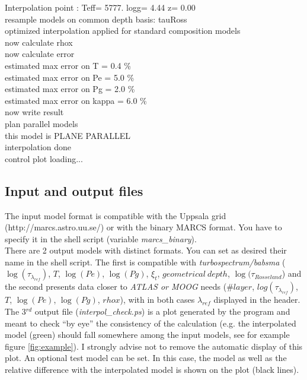 \documentclass[11pt]{article}
\begin{document}
Interpolation point : Teff=   5777.  logg= 4.44  z=  0.00\\
 resample models on common depth basis: tauRoss\\
 optimized interpolation applied for standard composition models\\
 now calculate rhox\\
 now calculate error\\
    estimated max error on T =  0.4 \%\\
   estimated max error on Pe =  5.0 \%\\
   estimated max error on Pg =  2.0 \%\\
estimated max error on kappa =  6.0 \%\\
 now write result\\
 plan parallel models\\
  this model is PLANE PARALLEL\\
 interpolation done\\
control plot loading...\\

\subsection{Input and output files}
The input model format is compatible with the Uppsala grid (http://marcs.astro.uu.se/) or with the binary MARCS format.
 You have to specify it in the shell script (variable \textit{marcs\_binary}). \\
There are 2 output models with distinct formats. You can set as desired their name in the shell script. The first is compatible with \textit{turbospectrum/babsma} ($\log (\tau_{\lambda_{ref}})$, $T$, $\log (Pe)$, $\log (Pg)$, $\xi_t$, $geometrical~depth$, $\log(\tau_{Rosseland}$) and the second presents data closer to \textit{ATLAS or MOOG} needs ($\# layer$, $log(\tau_{\lambda_{ref}})$, $T$, $\log(Pe)$, $\log(Pg)$, $rhox$), with in both cases $\lambda_{ref}$ displayed in the header.\\
The 3$^{rd}$ output file (\textit{interpol\_check.ps}) is a plot generated by the program and meant to check ``by eye'' the consistency of the calculation (e.g. the interpolated model (green) should fall somewhere among the input models, see for example figure \ref{fig:example}). I strongly advise not to remove the automatic display of this plot. An optional test model can be set. In this case, the model as well as the relative difference with the interpolated model is shown on the plot (black lines).
\end{document}
